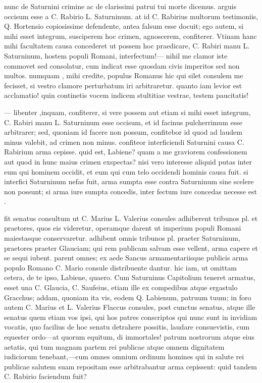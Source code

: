  nunc de Saturnini crimine ac de clarissimi patrui tui morte dicemus. arguis occisum esse a C. Rabirio L. Saturninum. at id C. Rabirius multorum testimoniis, Q. Hortensio copiosissime defendente, antea falsum esse docuit; ego autem, si mihi esset integrum, susciperem hoc crimen, agnoscerem, confiterer. Vtinam hanc mihi facultatem causa concederet ut possem hoc praedicare, C. Rabiri manu L. Saturninum, hostem populi Romani, interfectum!— nihil me clamor iste commovet sed consolatur, cum indicat esse quosdam civis imperitos sed non multos. numquam , mihi credite, populus Romanus hic qui silet consulem me fecisset, si vestro clamore perturbatum iri arbitraretur. quanto iam levior est acclamatio! quin continetis vocem indicem stultitiae vestrae, testem paucitatis!

 — libenter ,inquam, confiterer, si vere possem aut etiam si mihi esset integrum, C. Rabiri manu L. Saturninum esse occisum, et id facinus pulcherrimum esse arbitrarer; sed, quoniam id facere non possum, confitebor id quod ad laudem minus valebit, ad crimen non minus. confiteor interficiendi Saturnini causa C. Rabirium arma cepisse. quid est, Labiene? quam a me graviorem confessionem aut quod in hunc maius crimen exspectas? nisi vero interesse aliquid putas inter eum qui hominem occidit, et eum qui cum telo occidendi hominis causa fuit. si interfici Saturninum nefas fuit, arma sumpta esse contra Saturninum sine scelere non possunt; si arma iure sumpta concedis, inter fectum iure concedas necesse est .

 fit senatus consultum ut C. Marius L. Valerius consules adhiberent tribunos pl. et praetores, quos eis videretur, operamque darent ut imperium populi Romani maiestasque conservaretur. adhibent omnis tribunos pl. praeter Saturninum, praetores praeter Glauciam; qui rem publicam salvam esse vellent, arma capere et se sequi iubent. parent omnes; ex aede Sancus armamentariisque publicis arma populo Romano C. Mario consule distribuente dantur. hic iam, ut omittam cetera, de te ipso, Labiene, quaero. Cum Saturninus Capitolium teneret armatus, esset una C. Glaucia, C. Saufeius, etiam ille ex compedibus atque ergastulo Gracchus; addam, quoniam ita vis, eodem Q. Labienum, patruum tuum; in foro autem C. Marius et L. Valerius Flaccus consules, post cunctus senatus, atque ille senatus quem etiam vos ipsi, qui hos patres conscriptos qui nunc sunt in invidiam vocatis, quo facilius de hoc senatu detrahere possitis, laudare consuevistis, cum equester ordo—at quorum equitum, di immortales! patrum nostrorum atque eius aetatis, qui tum magnam partem rei publicae atque omnem dignitatem iudiciorum tenebant,—cum omnes omnium ordinum homines qui in salute rei publicae salutem suam repositam esse arbitrabantur arma cepissent: quid tandem C. Rabirio faciendum fuit?

